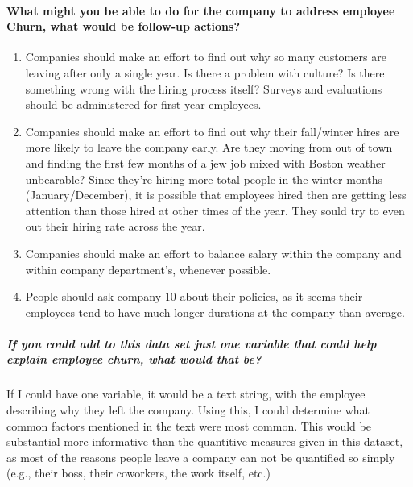 \documentclass[11pt]{article}
\begin{document}
\paragraph{What might you be able to do for the company to address
employee Churn, what would be follow-up
actions?}\label{what-might-you-be-able-to-do-for-the-company-to-address-employee-churn-what-would-be-follow-up-actions}

\begin{enumerate}
\def\labelenumi{(\arabic{enumi})}
\item
  Companies should make an effort to find out why so many customers are
  leaving after only a single year. Is there a problem with culture? Is
  there something wrong with the hiring process itself? Surveys and
  evaluations should be administered for first-year employees.
\item
  Companies should make an effort to find out why their fall/winter
  hires are more likely to leave the company early. Are they moving from
  out of town and finding the first few months of a jew job mixed with
  Boston weather unbearable? Since they're hiring more total people in
  the winter months (January/December), it is possible that employees
  hired then are getting less attention than those hired at other times
  of the year. They sould try to even out their hiring rate across the
  year.
\item
  Companies should make an effort to balance salary within the company
  and within company department's, whenever possible.
\item
  People should ask company 10 about their policies, as it seems their
  employees tend to have much longer durations at the company than
  average.
\end{enumerate}

\subparagraph{If you could add to this data set just one variable that
could help explain employee churn, what would that
be?}\label{if-you-could-add-to-this-data-set-just-one-variable-that-could-help-explain-employee-churn-what-would-that-be}

If I could have one variable, it would be a text string, with the
employee describing why they left the company. Using this, I could
determine what common factors mentioned in the text were most common.
This would be substantial more informative than the quantitive measures
given in this dataset, as most of the reasons people leave a company can
not be quantified so simply (e.g., their boss, their coworkers, the work
itself, etc.)


    
    
    
    
\end{document}
